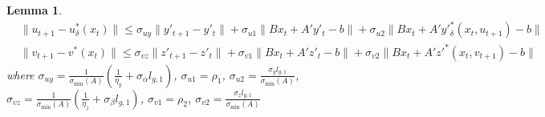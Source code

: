 \documentclass{article}
\theoremstyle{plain}
\newtheorem{lemma}[theorem]{Lemma}
\theoremstyle{definition}
\theoremstyle{remark}
\begin{document}
\begin{lemma}\label{lemma: uv error bounds}
\begin{align*}
    &\|u_{t+1}-u^*_\delta(x_t)\|\leq \sigma_{uy}\|y'_{t+1}-y'_t\|+\sigma_{u1}\|Bx_t+A'y'_t-b\|+\sigma_{u2}\|Bx_t+A'y'^*_\delta(x_t, u_{t+1})-b\|\\
    &\|v_{t+1}-v^*(x_t)\|\leq \sigma_{vz}\|z'_{t+1}-z'_t\|+\sigma_{v1}\|Bx_t+A'z'_t-b\|+\sigma_{v2}\|Bx_t+A'z'^*(x_t, v_{t+1})-b\|
\end{align*}
where $\sigma_{uy}=\frac{1}{\sigma_{\min}(A)}(\frac{1}{\eta_y}+\sigma_\alpha l_{g,1})$, $\sigma_{u1}=\rho_1$, $\sigma_{u2}=\frac{\sigma_y l_{g,1}}{\sigma_{\min}(A)}$, 
$\sigma_{vz}=\frac{1}{\sigma_{\min}(A)}(\frac{1}{\eta_z}+\sigma_\beta l_{g,1})$, $\sigma_{v1}=\rho_2$, $\sigma_{v2}=\frac{\sigma_z l_{g,1}}{\sigma_{\min}(A)}$


\end{lemma}
\end{document}
